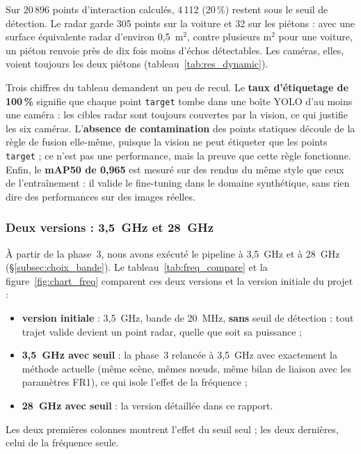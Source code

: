 \documentclass[12pt,a4paper,titlepage]{article}
\begin{document}
Sur 20\,896 points d'interaction calculés, 4\,112 (20\,\%) restent sous le seuil de détection. Le radar garde 305 points sur la voiture et 32 sur les piétons : avec une surface équivalente radar d'environ 0,5~m$^2$, contre plusieurs m$^2$ pour une voiture, un piéton renvoie près de dix fois moins d'échos détectables. Les caméras, elles, voient toujours les deux piétons (tableau~\ref{tab:res_dynamic}).

Trois chiffres du tableau demandent un peu de recul. Le \textbf{taux d'étiquetage de 100\,\%} signifie que chaque point \texttt{target} tombe dans une boîte YOLO d'au moins une caméra : les cibles radar sont toujours couvertes par la vision, ce qui justifie les six caméras. L'\textbf{absence de contamination} des points statiques découle de la règle de fusion elle-même, puisque la vision ne peut étiqueter que les points \texttt{target} ; ce n'est pas une performance, mais la preuve que cette règle fonctionne. Enfin, le \textbf{mAP50 de 0,965} est mesuré sur des rendus du même style que ceux de l'entraînement : il valide le fine-tuning dans le domaine synthétique, sans rien dire des performances sur des images réelles.

\subsubsection{Deux versions : 3,5~GHz et 28~GHz}

À partir de la phase~3, nous avons exécuté le pipeline à 3,5~GHz et à 28~GHz (\S\ref{subsec:choix_bande}). Le tableau~\ref{tab:freq_compare} et la figure~\ref{fig:chart_freq} comparent ces deux versions et la version initiale du projet :
\begin{itemize}[leftmargin=1.5em]
    \item \textbf{version initiale} : 3,5~GHz, bande de 20~MHz, \textbf{sans} seuil de détection : tout trajet valide devient un point radar, quelle que soit sa puissance ;
    \item \textbf{3,5~GHz avec seuil} : la phase~3 relancée à 3,5~GHz avec exactement la méthode actuelle (même scène, mêmes n\oe uds, même bilan de liaison avec les paramètres FR1), ce qui isole l'effet de la fréquence ;
    \item \textbf{28~GHz avec seuil} : la version détaillée dans ce rapport.
\end{itemize}
Les deux premières colonnes montrent l'effet du seuil seul ; les deux dernières, celui de la fréquence seule.
\end{document}
